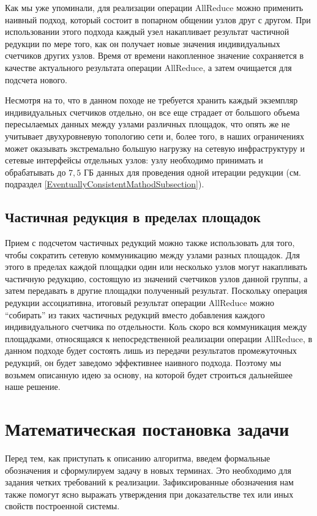 Как мы уже упоминали, для реализации операции AllReduce можно применить наивный подход, который состоит в попарном общении узлов друг с другом. При использовании этого подхода каждый узел накапливает результат частичной редукции по мере того, как он получает новые значения индивидуальных счетчиков других узлов. Время от времени накопленное значение сохраняется в качестве актуального результата операции AllReduce, а затем очищается для подсчета нового.

Несмотря на то, что в данном походе не требуется хранить каждый экземпляр индивидуальных счетчиков отдельно, он все еще страдает от большого объема пересылаемых данных между узлами различных площадок, что опять же не учитывает двухуровневую топологию сети и, более того, в наших ограничениях может оказывать экстремально большую нагрузку на сетевую инфраструктуру и сетевые интерфейсы отдельных узлов: узлу необходимо принимать и обрабатывать до $7,5$ ГБ данных для проведения одной итерации редукции (см. подраздел \ref{EventuallyConsistentMathodSubsection}).

\subsection{Частичная редукция в пределах площадок}
\label{GroupReductionSubsection}

Прием с подсчетом частичных редукций можно также использовать для того, чтобы сократить сетевую коммуникацию между узлами разных площадок. Для этого в пределах каждой площадки один или несколько узлов могут накапливать частичную редукцию, состоящую из значений счетчиков узлов данной группы, а затем передавать в другие площадки полученный результат. Поскольку операция редукции ассоциативна, итоговый результат операции AllReduce можно \enquote{собирать} из таких частичных редукций вместо добавления каждого индивидуального счетчика по отдельности. Коль скоро вся коммуникация между площадками, относящаяся к непосредственной реализации операции AllReduce, в данном подходе будет состоять лишь из передачи результатов промежуточных редукций, он будет заведомо эффективнее наивного подхода. Поэтому мы возьмем описанную идею за основу, на которой будет строиться дальнейшее наше решение.

\section{Математическая постановка задачи}

Перед тем, как приступать к описанию алгоритма, введем формальные обозначения и сформулируем задачу в новых терминах. Это необходимо для задания четких требований к реализации. Зафиксированные обозначения нам также помогут ясно выражать утверждения при доказательстве тех или иных свойств построенной системы.

